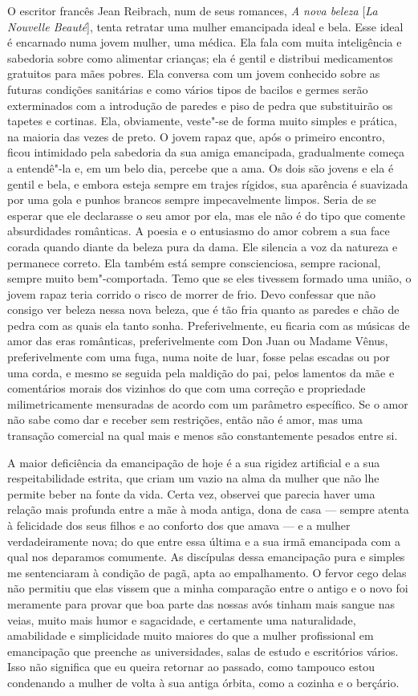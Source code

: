 O escritor francês Jean Reibrach, num de seus romances, \emph{A nova
beleza} {[}\emph{La Nouvelle Beauté}{]}, tenta retratar uma mulher
emancipada ideal e bela. Esse ideal é encarnado numa jovem mulher, uma
médica. Ela fala com muita inteligência e sabedoria sobre como alimentar
crianças; ela é gentil e distribui medicamentos gratuitos para mães
pobres. Ela conversa com um jovem conhecido sobre as futuras condições
sanitárias e como vários tipos de bacilos e germes serão exterminados
com a introdução de paredes e piso de pedra que substituirão os tapetes
e cortinas. Ela, obviamente, veste"-se de forma muito simples e prática,
na maioria das vezes de preto. O jovem rapaz que, após o primeiro
encontro, ficou intimidado pela sabedoria da sua amiga emancipada,
gradualmente começa a entendê"-la e, em um belo dia, percebe que a ama.
Os dois são jovens e ela é gentil e bela, e embora esteja sempre em
trajes rígidos, sua aparência é suavizada por uma gola e punhos brancos
sempre impecavelmente limpos. Seria de se esperar que ele declarasse o
seu amor por ela, mas ele não é do tipo que comente absurdidades
românticas. A poesia e o entusiasmo do amor cobrem a sua face corada
quando diante da beleza pura da dama. Ele silencia a voz da natureza e
permanece correto. Ela também está sempre conscienciosa, sempre
racional, sempre muito bem"-comportada. Temo que se eles tivessem formado
uma união, o jovem rapaz teria corrido o risco de morrer de frio. Devo
confessar que não consigo ver beleza nessa nova beleza, que é tão fria
quanto as paredes e chão de pedra com as quais ela tanto sonha.
Preferivelmente, eu ficaria com as músicas de amor das eras românticas,
preferivelmente com Don Juan ou Madame Vênus, preferivelmente com uma
fuga, numa noite de luar, fosse pelas escadas ou por uma corda, e mesmo
se seguida pela maldição do pai, pelos lamentos da mãe e comentários
morais dos vizinhos do que com uma correção e propriedade
milimetricamente mensuradas de acordo com um parâmetro específico. Se o
amor não sabe como dar e receber sem restrições, então não é amor, mas
uma transação comercial na qual mais e menos são constantemente pesados
​​entre si.

A maior deficiência da emancipação de hoje é a sua rigidez artificial e
a sua respeitabilidade estrita, que criam um vazio na alma da mulher que
não lhe permite beber na fonte da vida. Certa vez, observei que parecia
haver uma relação mais profunda entre a mãe à moda antiga, dona de casa ---
sempre atenta à felicidade dos seus filhos e ao conforto dos que
amava --- e a mulher verdadeiramente nova; do que entre essa última e a sua
irmã emancipada com a qual nos deparamos comumente. As discípulas dessa
emancipação pura e simples me sentenciaram à condição de pagã, apta ao
empalhamento. O fervor cego delas não permitiu que elas vissem que a
minha comparação entre o antigo e o novo foi meramente para provar que
boa parte das nossas avós tinham mais sangue nas veias, muito mais humor
e sagacidade, e certamente uma naturalidade, amabilidade e simplicidade
muito maiores do que a mulher profissional em emancipação que preenche
as universidades, salas de estudo e escritórios vários. Isso não
significa que eu queira retornar ao passado, como tampouco estou condenando a mulher de volta à sua antiga órbita, como a cozinha e o berçário.

